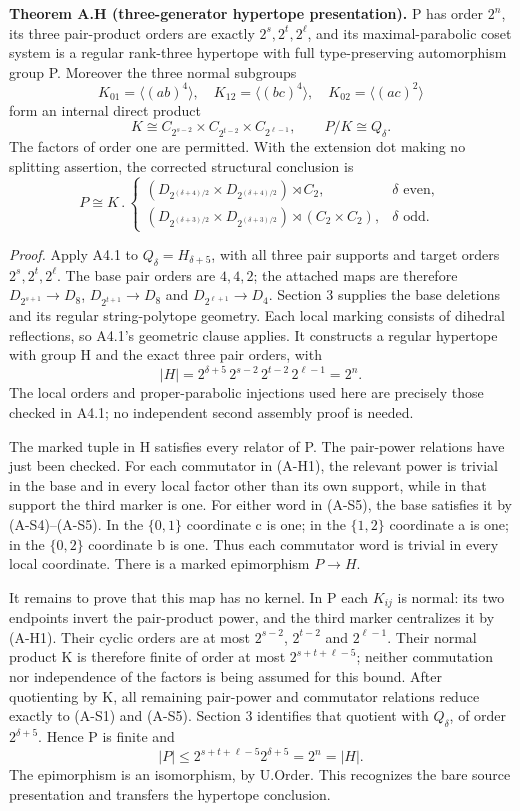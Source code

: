 \documentclass[
  11pt,
  a4paper,
]{article}
\begin{document}
\textbf{Theorem A.H (three-generator hypertope presentation).} P has
order \(2^n\), its three pair-product orders are exactly
\(2^s,2^t,2^\ell\), and its maximal-parabolic coset system is a regular
rank-three hypertope with full type-preserving automorphism group P.
Moreover the three normal subgroups \[
 K_{01}=\langle(ab)^4\rangle,\quad
 K_{12}=\langle(bc)^4\rangle,\quad
 K_{02}=\langle(ac)^2\rangle
\] form an internal direct product \[
 K\cong C_{2^{s-2}}\times C_{2^{t-2}}\times C_{2^{\ell-1}},
 \qquad P/K\cong Q_\delta.
 \tag{A-H2}
\] The factors of order one are permitted. With the extension dot making
no splitting assertion, the corrected structural conclusion is \[
 P\cong K\mathbin{.}
 \begin{cases}
 (D_{2^{(\delta+4)/2}}\times D_{2^{(\delta+4)/2}})\rtimes C_2,
     &\delta\text{ even},\\
 (D_{2^{(\delta+3)/2}}\times D_{2^{(\delta+3)/2}})\rtimes(C_2\times C_2),
     &\delta\text{ odd}.
 \end{cases}
 \tag{A-H3}
\]

\emph{Proof.} Apply A4.1 to \(Q_\delta=H_{\delta+5}\), with all three
pair supports and target orders \(2^s,2^t,2^\ell\). The base pair orders
are \(4,4,2\); the attached maps are therefore \(D_{2^{s+1}}\to D_8\),
\(D_{2^{t+1}}\to D_8\) and \(D_{2^{\ell+1}}\to D_4\). Section 3 supplies
the base deletions and its regular string-polytope geometry. Each local
marking consists of dihedral reflections, so A4.1's geometric clause
applies. It constructs a regular hypertope with group H and the exact
three pair orders, with \[
 |H|=2^{\delta+5}\,2^{s-2}\,2^{t-2}\,2^{\ell-1}=2^n.
\] The local orders and proper-parabolic injections used here are
precisely those checked in A4.1; no independent second assembly proof is
needed.

The marked tuple in H satisfies every relator of P. The pair-power
relations have just been checked. For each commutator in (A-H1), the
relevant power is trivial in the base and in every local factor other
than its own support, while in that support the third marker is one. For
either word in (A-S5), the base satisfies it by (A-S4)--(A-S5). In the
\(\{0,1\}\) coordinate c is one; in the \(\{1,2\}\) coordinate a is one;
in the \(\{0,2\}\) coordinate b is one. Thus each commutator word is
trivial in every local coordinate. There is a marked epimorphism
\(P\to H\).

It remains to prove that this map has no kernel. In P each \(K_{ij}\) is
normal: its two endpoints invert the pair-product power, and the third
marker centralizes it by (A-H1). Their cyclic orders are at most
\(2^{s-2}\), \(2^{t-2}\) and \(2^{\ell-1}\). Their normal product K is
therefore finite of order at most \(2^{s+t+\ell-5}\); neither
commutation nor independence of the factors is being assumed for this
bound. After quotienting by K, all remaining pair-power and commutator
relations reduce exactly to (A-S1) and (A-S5). Section 3 identifies that
quotient with \(Q_\delta\), of order \(2^{\delta+5}\). Hence P is finite
and \[
 |P|\le2^{s+t+\ell-5}2^{\delta+5}=2^n=|H|.
\] The epimorphism is an isomorphism, by U.Order. This recognizes the
bare source presentation and transfers the hypertope conclusion.
\end{document}
